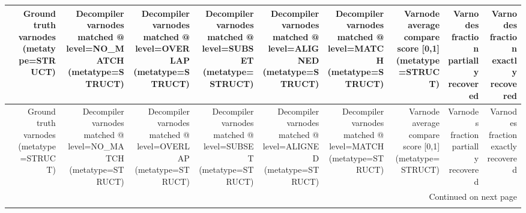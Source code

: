 \begin{longtable}{lrrrrrrrrr}
\toprule
{} &  Ground truth varnodes (metatype=STRUCT) &  Decompiler varnodes matched @ level=NO\_MATCH (metatype=STRUCT) &  Decompiler varnodes matched @ level=OVERLAP (metatype=STRUCT) &  Decompiler varnodes matched @ level=SUBSET (metatype=STRUCT) &  Decompiler varnodes matched @ level=ALIGNED (metatype=STRUCT) &  Decompiler varnodes matched @ level=MATCH (metatype=STRUCT) &  Varnode average compare score {[}0,1] (metatype=STRUCT) &  Varnodes fraction partially recovered &  Varnodes fraction exactly recovered \\
\midrule
\endfirsthead

\toprule
{} &  Ground truth varnodes (metatype=STRUCT) &  Decompiler varnodes matched @ level=NO\_MATCH (metatype=STRUCT) &  Decompiler varnodes matched @ level=OVERLAP (metatype=STRUCT) &  Decompiler varnodes matched @ level=SUBSET (metatype=STRUCT) &  Decompiler varnodes matched @ level=ALIGNED (metatype=STRUCT) &  Decompiler varnodes matched @ level=MATCH (metatype=STRUCT) &  Varnode average compare score {[}0,1] (metatype=STRUCT) &  Varnodes fraction partially recovered &  Varnodes fraction exactly recovered \\
\midrule
\endhead
\midrule
\multicolumn{10}{r}{{Continued on next page}} \\
\midrule
\endfoot


\end{longtable}
